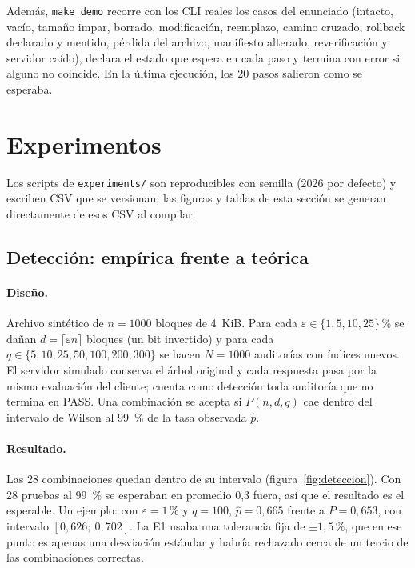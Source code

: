 \documentclass[11pt,a4paper]{article}
\newcommand{\code}[1]{\texttt{#1}}
\begin{document}
Además, \code{make demo} recorre con los CLI reales los casos del enunciado (intacto, vacío, tamaño
impar, borrado, modificación, reemplazo, camino cruzado, rollback declarado y mentido, pérdida del
archivo, manifiesto alterado, reverificación y servidor caído), declara el estado que espera en cada
paso y termina con error si alguno no coincide. En la última ejecución, los 20 pasos salieron como se
esperaba.

\section{Experimentos}
\label{sec:exp}

Los scripts de \code{experiments/} son reproducibles con semilla (2026 por defecto) y escriben CSV
que se versionan; las figuras y tablas de esta sección se generan directamente de esos CSV al compilar.

\subsection{Detección: empírica frente a teórica}
\paragraph{Diseño.} Archivo sintético de $n=1000$ bloques de 4~KiB. Para cada
$\varepsilon\in\{1,5,10,25\}$\,\% se dañan $d=\lceil\varepsilon n\rceil$ bloques (un bit invertido)
y para cada $q\in\{5,10,25,50,100,200,300\}$ se hacen $N=1000$ auditorías con índices nuevos. El
servidor simulado conserva el árbol original y cada respuesta pasa por la misma evaluación del
cliente; cuenta como detección toda auditoría que no termina en PASS. Una combinación se acepta si
$P(n,d,q)$ cae dentro del intervalo de Wilson \cite{wilson} al 99~\% de la tasa observada $\hat p$.

\paragraph{Resultado.} Las 28 combinaciones quedan dentro de su intervalo
(figura~\ref{fig:deteccion}). Con 28 pruebas al 99~\% se esperaban en promedio 0,3 fuera, así que el
resultado es el esperable. Un ejemplo: con $\varepsilon=1$\,\% y $q=100$, $\hat p=0{,}665$ frente a
$P=0{,}653$, con intervalo $[0{,}626;\ 0{,}702]$. La E1 usaba una tolerancia fija de $\pm1{,}5$\,\%,
que en ese punto es apenas una desviación estándar y habría rechazado cerca de un tercio de las
combinaciones correctas.
\end{document}
